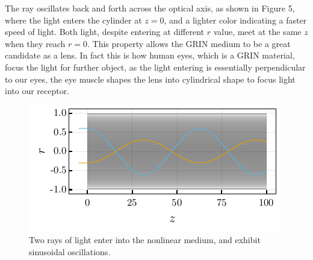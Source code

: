 \documentclass[%
 amsmath,amssymb,
aps,
 fleqn,
 notitlepage,
]{revtex4-2}
\begin{document}
The ray oscillates back and forth across the optical axis, as shown in Figure 5, where the light enters the cylinder at $z=0$, and a lighter color indicating a faster speed of light. Both light, despite entering at different $r$ value, meet at the same $z$ when they reach $r = 0$. This property allows the GRIN medium to be a great candidate as a lens. In fact this is how human eyes, which is a GRIN material, focus the light for further object, as the light entering is essentially perpendicular to our eyes, the eye muscle shapes the lens into cylindrical shape to focus light into our receptor.

\begin{figure}
    \includegraphics{rays.pdf}
    \caption{Two rays of light enter into the nonlinear medium, and exhibit sinusoidal oscillations.}
    \label{fig: rays}
\end{figure}
\end{document}
